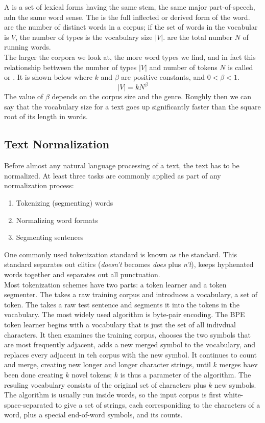\documentclass{article}
\begin{document}
A  is a set of lexical forms having the same stem, the same major part-of-speech, adn the same word sense. The  is the full inflected or derived form of the word.  are the number of distinct words in a corpus; if the set of words in the vocabular is $V$, the number of types is the vocabulary size $\vert V \vert$.  are the total number $N$ of running words. \\ 

The larger the corpora we look at, the more word types we find, and in fact this relationship bettween the number of types $\vert V \vert$ and number of tokens $N$ is called  or . It is shown below where $k$ and $\beta$ are positive constants, and $0 < \beta < 1$. $$\vert V \vert = kN^{\beta}$$ The value of $\beta$ depends on the corpus size and the genre. Roughly then we can say that the vocabulary size for a text goes up significantly faster than the square root of its length in words. \\ 

\subsection{Text Normalization}

Before almost any natural language processing of a text, the text has to be normalized. At least three tasks are commonly applied as part of any normalization process: 
\begin{enumerate}
  \item Tokenizing (segmenting) words 
  \item Normalizing word formats 
  \item Segmenting sentences
\end{enumerate}
One commonly used tokenization standard is known as the  standard. This standard separates out clitics (\emph{doesn't} becomes \emph{does} plus \emph{n't}), keeps hyphenated words together and separates out all punctuation. \\ 

Most tokenization schemes have two parts: a token learner and a token segmenter. The  takes a raw training corpus and introduces a vocabulary, a set of token. The  takes a raw test sentence and segments it into the tokens in the vocabulary. The most widely used algorithm is byte-pair encoding. The BPE token learner begins with a vocabulary that is just the set of all indivdual characters. It then examines the training corpus, chooses the two symbols that are most frequently adjacent, adds a new merged symbol to the vocabulary, and replaces every adjacent in teh corpus with the new symbol. It continues to count and merge, creating new longer and longer character strings, until $k$ merges haev been done creating $k$ novel tokens; $k$ is thus a parameter of the algorithm. The resuling vocabulary consists of the original set of characters plus $k$ new symbols. The algorithm is usually run inside words, so the input corpus is first white-space-separated to give a set of strings, each corresponiding to the characters of a word, plus a special end-of-word symbols, and its counts. 
\end{document}
